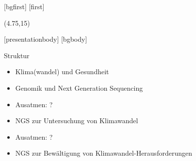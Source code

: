 [bgfirst]
[first]
\subtitle{\theslidesection: Next Generation Sequencing}
\begin{frame}[noframenumbering]
    \titlepage
    \begin{textblock}{10}(4.75,15)
        \cite{ProgrammingLogo}
    \end{textblock}
\end{frame}
[presentationbody] 
[bgbody]

\begin{frame}{Struktur}
	\begin{itemize}
		\item Klima(wandel) und Gesundheit
		\item Genomik und Next Generation Sequencing
		\item Ausatmen: ?
		\item NGS zur Untersuchung von Klimawandel
		\item Ausatmen: ?
		\item NGS zur Bewältigung von Klimawandel-Herausforderungen
	\end{itemize}
\end{frame}

